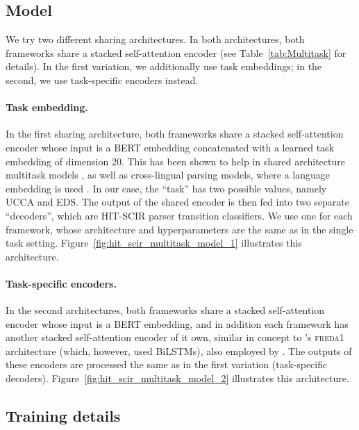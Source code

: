 \documentclass[11pt,a4paper]{article}
\begin{document}
\subsection{Model}\label{sec:multitask-model}
We try two different sharing architectures.
In both architectures, both frameworks share a stacked self-attention encoder (see Table~\ref{tab:Multitask} for details). In the first variation, we additionally use task embeddings; in the second, we use task-specific encoders instead.

\paragraph{Task embedding.}
In the first sharing architecture, both frameworks share a stacked self-attention encoder whose input is a BERT embedding concatenated with a learned task embedding of dimension 20. This has been shown to help in shared architecture multitask models \cite{Sun2020ERNIE2A}, as well as cross-lingual parsing models, where a language embedding is used \cite{ammar-etal-2016-many,de-lhoneux-etal-2018-parameter}.
In our case, the ``task'' has two possible values, namely UCCA and EDS.
The output of the shared encoder is then fed into two separate ``decoders'', which are HIT-SCIR parser transition classifiers. We use one for each framework, whose architecture and hyperparameters are the same as in the single task setting.
Figure~\ref{fig:hit_scir_multitask_model_1} illustrates this architecture.

\paragraph{Task-specific encoders.}
In the second architectures, both frameworks share a stacked self-attention encoder whose input is a BERT embedding, and in addition each framework has another stacked self-attention encoder of it own,
similar in concept to 's \textsc{freda1} architecture (which, however, used BiLSTMs), also employed by .
The outputs of these encoders are processed the same as in the first variation (task-specific decoders). Figure~\ref{fig:hit_scir_multitask_model_2} illustrates this architecture.

\subsection{Training details}\label{sec:multitask-training}
\end{document}
